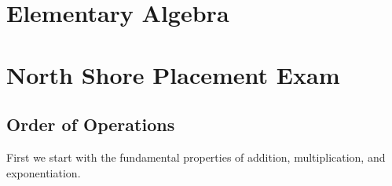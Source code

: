 \documentclass[crop=false,class=article,oneside]{standalone}
\begin{document}
    \ifx\ifmathcourseselementaryalgebra\undefined
        \section*{Elementary Algebra}
        \setcounter{section}{1}
        \renewcommand\thefigure{\arabic{section}.\arabic{figure}}
        \renewcommand\thesubfigure{%
            \arabic{section}.\arabic{figure}.\arabic{subfigure}}
    \else
        \section{North Shore Placement Exam}
    \fi
    \subsection{Order of Operations}
        First we start with the fundamental properties of
        addition, multiplication, and exponentiation.
\end{document}
